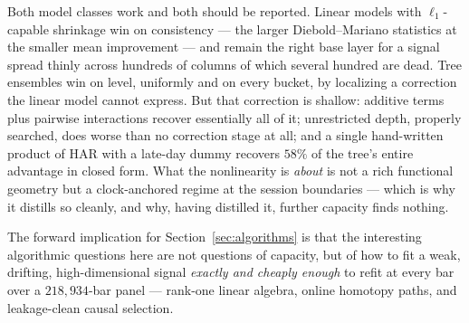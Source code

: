 Both model classes work and both should be reported. Linear models with
$\ell_1$-capable shrinkage win on consistency --- the larger Diebold--Mariano
statistics at the smaller mean improvement --- and remain the right base layer
for a signal spread thinly across hundreds of columns of which several hundred
are dead. Tree ensembles win on level, uniformly and on every bucket, by
localizing a correction the linear model cannot express. But that correction is
shallow: additive terms plus pairwise interactions recover essentially all of it;
unrestricted depth, properly searched, does worse than no correction stage at
all; and a single hand-written product of HAR with a late-day dummy recovers
$58\%$ of the tree's entire advantage in closed form. What the nonlinearity is
\emph{about} is not a rich functional geometry but a clock-anchored regime at the
session boundaries --- which is why it distills so cleanly, and why, having
distilled it, further capacity finds nothing.

The forward implication for Section~\ref{sec:algorithms} is that the interesting
algorithmic questions here are not questions of capacity, but of how to fit a
weak, drifting, high-dimensional signal \emph{exactly and cheaply enough} to
refit at every bar over a $218{,}934$-bar panel --- rank-one linear algebra,
online homotopy paths, and leakage-clean causal selection.
